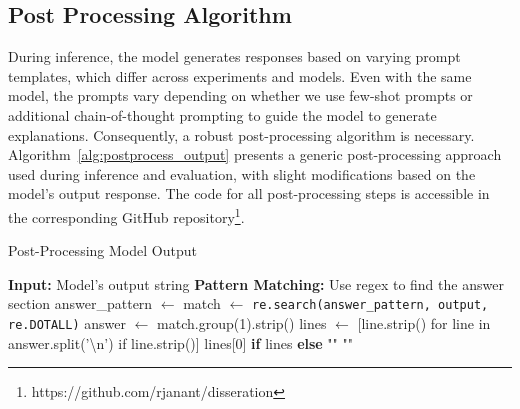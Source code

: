 \documentclass[logo,msc]{infthesis}           %
\begin{document}
\subsection{Post Processing Algorithm}

During inference, the model generates responses based on varying prompt templates, which differ across experiments and models. Even with the same model, the prompts vary depending on whether we use few-shot prompts or additional chain-of-thought prompting to guide the model to generate explanations. Consequently, a robust post-processing algorithm is necessary. Algorithm~\ref{alg:postprocess_output} presents a generic post-processing approach used during inference and evaluation, with slight modifications based on the model's output response. The code for all post-processing steps is accessible in the corresponding GitHub repository\footnote{https://github.com/rjanant/disseration}.
\begin{algorithm}
\caption{Post-Processing Model Output}
\label{alg:postprocess_output}
\begin{algorithmic}[H]
    \State \textbf{Input:} Model's output string
    \State \textbf{Pattern Matching:} Use regex to find the answer section
    \State answer\_pattern $\gets$ 
    \State {}
    \State {}
    \State match $\gets$ \texttt{re.search(answer\_pattern, output, re.DOTALL)}
        \State answer $\gets$ match.group(1).strip()
        \State lines $\gets$ [line.strip() for line in answer.split('\textbackslash n') if line.strip()]
        \State \Return lines[0] \textbf{if} lines \textbf{else} ""
    \Else
        \State \Return ""
    \EndIf
\EndFunction
\end{algorithmic}
\end{algorithm}
\end{document}
